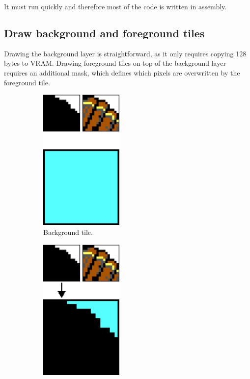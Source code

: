 \documentclass[book.tex]{subfiles}
\begin{document}
\par
It must run quickly and therefore most of the code is written in assembly.

\subsection{Draw background and foreground tiles}
Drawing the background layer is straightforward, as it only requires copying 128 bytes to VRAM. Drawing foreground tiles on top of the background layer requires an additional mask, which defines which pixels are overwritten by the foreground tile.\\

\begin{figure}[H]
\centering
 \begin{subfigure}{0.32\textwidth}
 	\centering
 	\includegraphics[width=0.45\textwidth]{screenshots_300dpi/game/mask_tiles_1.png}
 	\caption{Background tile.}
 \end{subfigure}
 \begin{subfigure}{0.32\textwidth}
 	\centering
 	\includegraphics[width=0.45\textwidth]{screenshots_300dpi/game/mask_tiles_2.png}

\end{subfigure}
\end{figure}
\end{document}
